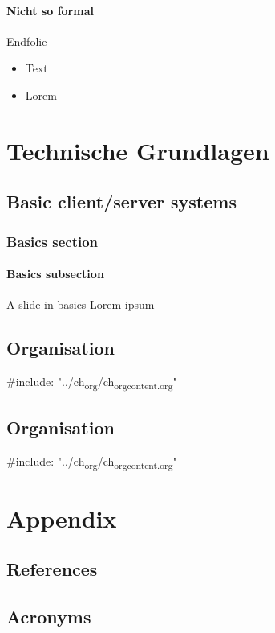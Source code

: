 \documentclass[a4paper,twoside,11pt]{book}
\begin{document}
\subsection{Nicht so formal}
\label{sec:weniger_formal}
\begin{frame}[label={f:ende}]{Endfolie}
\begin{itemize}
\item Text
\item Lorem
\end{itemize}
\end{frame}


\part{Technische Grundlagen}
\label{sec:orgec00902}

\chapter{Basic client/server systems}
\label{sec:org8cd8a23}

\label{ch:basics}
\maketitle 


\section{Basics section}
\label{sec:basics_sec}
\subsection{Basics subsection}
\label{sec:basics_subsec}
\begin{frame}[label={f:basic_slide}]{A slide in basics}
Lorem ipsum
\end{frame}




\chapter{Organisation}
\label{sec:org986137f}

\#include: "../ch\textsubscript{org}/ch\textsubscript{org}\textsubscript{content.org}"

\chapter{Organisation}
\label{sec:org4358563}

\#include: "../ch\textsubscript{org}/ch\textsubscript{org}\textsubscript{content.org}"

\part{Appendix}
\label{sec:orgf3a2e63}


\appendix 


\chapter{References}
\label{sec:org806d386}

\printbibliography[heading=none]

\chapter{Acronyms}
\label{sec:org37d6858}


\end{document}
